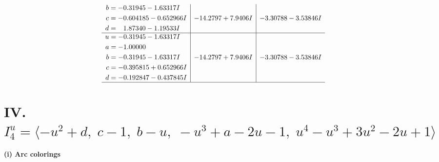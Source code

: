 \documentclass[1p]{elsarticle_modified}
\theoremstyle{definition}
\begin{document}
$$\begin{array}{c|c|c}
\begin{aligned}
b &= -0.31945 - 1.63317 I \\
c &= -0.604185 - 0.652966 I \\
d &= \phantom{-}1.87340 - 1.19533 I\end{aligned}
 & -14.2797 + 7.9406 I & -3.30788 - 3.53846 I \\ \hline\begin{aligned}
u &= -0.31945 - 1.63317 I \\
a &= -1.00000\phantom{ +0.000000I} \\
b &= -0.31945 - 1.63317 I \\
c &= -0.395815 + 0.652966 I \\
d &= -0.192847 - 0.437845 I\end{aligned}
 & -14.2797 + 7.9406 I & -3.30788 - 3.53846 I\\
 \hline 
 \end{array}$$\newpage\newpage\renewcommand{\arraystretch}{1}
\centering \section*{IV. $I^u_{4}= \langle - u^2+d,\;c-1,\;b- u,\;- u^3+a-2 u-1,\;u^4- u^3+3 u^2-2 u+1 \rangle$}
\flushleft \textbf{(i) Arc colorings}\\
\end{document}

